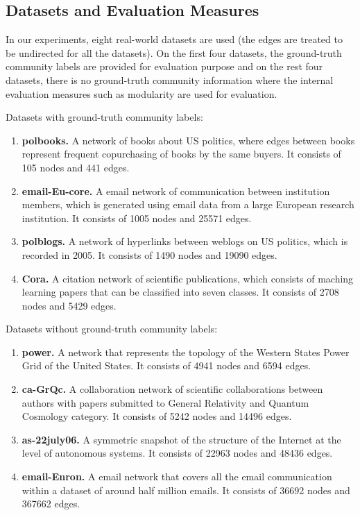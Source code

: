 \documentclass[sigconf]{acmart}
\begin{document}
\subsection{Datasets and Evaluation Measures}

In our experiments, eight real-world datasets are used (the edges are treated to be undirected for all the datasets). On the first four datasets, the ground-truth community labels are provided for evaluation purpose and on the rest four datasets, there is no ground-truth community information where the internal evaluation measures such as modularity are used for evaluation. 

Datasets with ground-truth community labels:
\begin{enumerate}[{1)}]
\item
\textbf{polbooks\footnotemark[1].} A network of books about US politics, where edges between books represent frequent copurchasing of books by the same buyers. It consists of 105 nodes and 441 edges.
\item
\textbf{email-Eu-core\footnotemark[2].} A email network of communication between institution members, which is generated using email data from a large European research institution. It consists of 1005 nodes and 25571 edges.
\item
\textbf{polblogs\footnotemark[1].} A network of hyperlinks between weblogs on US politics, which is recorded in 2005. It consists of 1490 nodes and 19090 edges.
\item
\textbf{Cora\footnotemark[3].} A citation network of scientific publications, which consists of maching learning papers that can be classified into seven classes. It consists of 2708 nodes and 5429 edges.
\end{enumerate}

Datasets without ground-truth community labels:
\begin{enumerate}[{1)}]
\item
\textbf{power\footnotemark[4].} A network that represents the topology of the Western States Power Grid of the United States. It consists of 4941 nodes and 6594 edges.
\item
\textbf{ca-GrQc\footnotemark[2].} A collaboration network of scientific collaborations between authors with papers submitted to General Relativity and Quantum Cosmology category. It consists of 5242 nodes and 14496 edges.
\item
\textbf{as-22july06\footnotemark[4].} A symmetric snapshot of the structure of the Internet at the level of autonomous systems. It consists of 22963 nodes and 48436 edges.
\item
\textbf{email-Enron\footnotemark[4].} A email network that covers all the email communication within a dataset of around half million emails. It consists of 36692 nodes and 367662 edges.
\end{enumerate}
\end{document}
